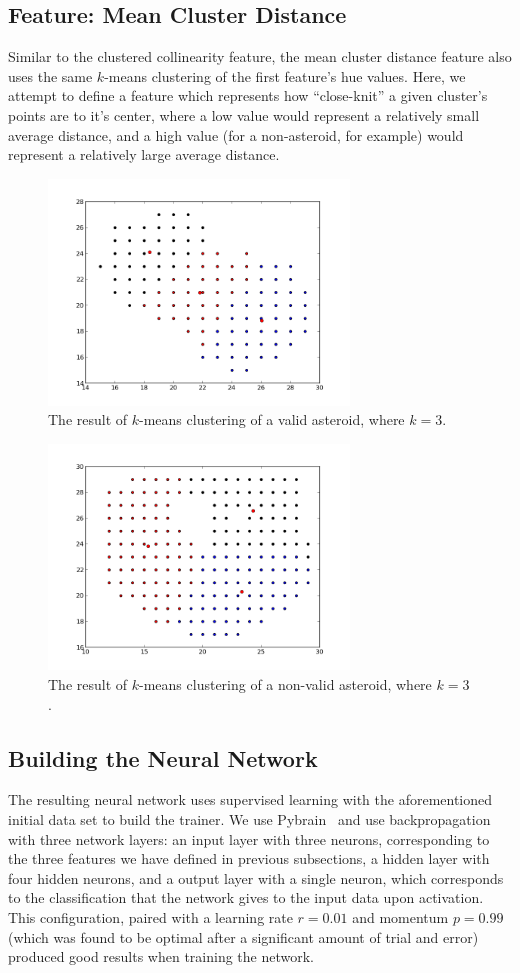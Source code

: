 \documentclass[conference]{IEEEtran}
\begin{document}
\subsection{Feature: Mean Cluster Distance}
Similar to the clustered collinearity feature, the mean cluster distance feature
also uses the same $k$-means clustering of the first feature's hue values. Here,
we attempt to define a feature which represents how ``close-knit'' a given
cluster's points are to it's center, where a low value would represent a
relatively small average distance, and a high value (for a non-asteroid, for
example) would represent a relatively large average distance.

\begin{figure}
\centering
\includegraphics[width=80mm]{refs/clust-18364.png}
\caption{The result of $k$-means clustering of a valid asteroid, where $k=3$.}
\end{figure}

\begin{figure}
\centering
\includegraphics[width=80mm]{refs/clust-494.png}
\caption{The result of $k$-means clustering of a non-valid asteroid, where $k=3$.}
\end{figure}

\subsection{Building the Neural Network}
The resulting neural network uses supervised learning with the aforementioned
initial data set to build the trainer. We use Pybrain~\cite{pybrain} and use
backpropagation with three network layers: an input layer with three neurons,
corresponding to the three features we have defined in previous subsections, a
hidden layer with four hidden neurons, and a output layer with a single neuron,
which corresponds to the classification that the network gives to the input data
upon activation. This configuration, paired with a learning rate $r = 0.01$ and
momentum $p = 0.99$ (which was found to be optimal after a significant amount of
trial and error) produced good results when training the network.
\end{document}
